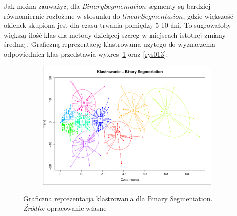 \documentclass[polish, twoside, 12pt, a4paper]{article}
\theoremstyle{definition}
\theoremstyle{plain}
\theoremstyle{remark}
\begin{document}
Jak można zauważyć, dla \(Binary Segmentation\) segmenty są bardziej równomiernie rozłożone w stosunku do \(linear Segmentation\), gdzie większość okienek skupiona jest dla czasu trwania 
pomiędzy 5-10 dni. To sugrowałoby większą ilość klas dla metody dzielącej szereg w miejscach istotnej zmiany średniej. Graficzną reprezentację klastrowania użytego do wyznaczenia odpowiednich 
klas przedstawia wykres~\ref{rys012} oraz \ref{rys013}.

\begin{figure}[H]
  \centering

  \begin{subfigure}[t]{1.00\textwidth}
    \includegraphics[width=\textwidth]{./rys012}
  \end{subfigure}

  \captionsetup{margin=10pt,font=small,labelfont=bf,width=.8\textwidth}

  \caption[Graficzna reprezentacja klastrowania dla Binary Segmentation]{Graficzna reprezentacja klastrowania dla Binary Segmentation. \textit{Źródło:} opracowanie własne}\label{rys012}
\end{figure}
\end{document}
